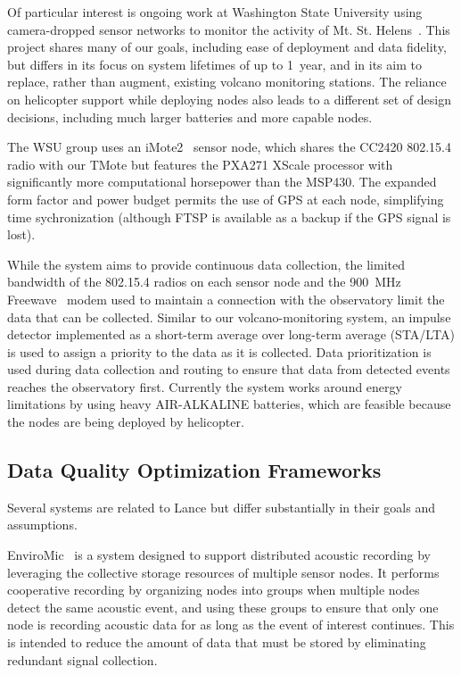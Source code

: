 Of particular interest is ongoing work at Washington State University using
camera-dropped sensor networks to monitor the activity of Mt. St.
Helens~\cite{wsuvolcano-mobisys09}. This project shares many of our goals,
including ease of deployment and data fidelity, but differs in its focus on
system lifetimes of up to 1~year, and in its aim to replace, rather than
augment, existing volcano monitoring stations. The reliance on helicopter
support while deploying nodes also leads to a different set of design
decisions, including much larger batteries and more capable nodes.

The WSU group uses an iMote2~\cite{imote2} sensor node, which shares the
CC2420 802.15.4 radio with our TMote but features the PXA271 XScale processor
with significantly more computational horsepower than the MSP430. The
expanded form factor and power budget permits the use of GPS at each node,
simplifying time sychronization (although FTSP is available as a backup if
the GPS signal is lost).

While the system aims to provide continuous data collection, the limited
bandwidth of the 802.15.4 radios on each sensor node and the 900~MHz
Freewave~\cite{freewave} modem used to maintain a connection with the
observatory limit the data that can be collected. Similar to our
volcano-monitoring system, an impulse detector implemented as a short-term
average over long-term average (STA/LTA) is used to assign a priority to the
data as it is collected. Data prioritization is used during data collection
and routing to ensure that data from detected events reaches the observatory
first. Currently the system works around energy limitations by using heavy
AIR-ALKALINE batteries, which are feasible because the nodes are being
deployed by helicopter.

\subsection{Data Quality Optimization Frameworks}
\label{lance-sec-related}

Several systems are related to Lance but differ substantially in their goals
and assumptions.

EnviroMic~\cite{enviromic} is a system designed to support distributed
acoustic recording by leveraging the collective storage resources of multiple
sensor nodes. It performs cooperative recording by organizing nodes into
groups when multiple nodes detect the same acoustic event, and using these
groups to ensure that only one node is recording acoustic data for as long as
the event of interest continues. This is intended to reduce the amount of
data that must be stored by eliminating redundant signal collection.

